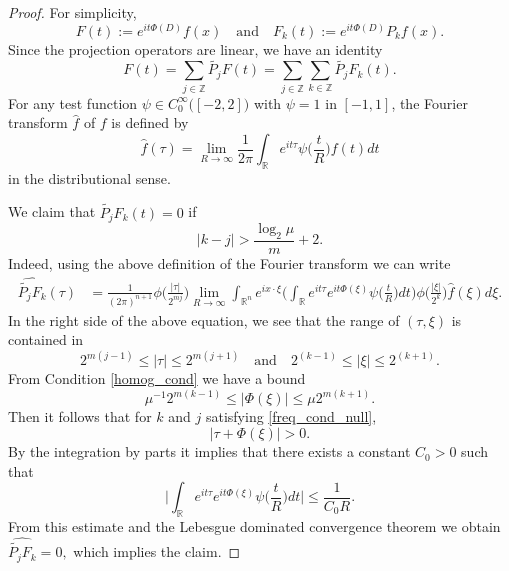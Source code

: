 \documentclass[11pt,reqno]{amsart}
\theoremstyle{plain}
\theoremstyle{definition}
\theoremstyle{remark}
\numberwithin{equation}{section}
\begin{document}
\begin{proof}
For simplicity,
    \[
    F (t) := e^{it\Phi(D)} f(x) \quad\mbox{and}\quad F_k (t) := e^{it\Phi(D)}P_kf(x).
    \]
Since the projection operators are linear, we have an identity
    \[
    F(t) = \sum_{j\in \mathbb{Z}} \widetilde{P_j}F(t) = \sum_{j\in \mathbb{Z}} \sum_{k\in \mathbb{Z}} \widetilde{P_j}F_k(t).
    \]
For any test function $\psi \in C_0^{\infty} \big( [-2, 2] \big)$ with $\psi = 1$ in $[-1,1]$,
the Fourier transform $\widehat{f}$ of $f$ is defined by
    \[
    \widehat{f}(\tau) = \lim_{R\rightarrow\infty} \frac{1}{2\pi} \int_{\mathbb{R}} e^{it\tau} \psi\Big(\frac{t}{R}\Big) f(t) dt
    \]
in the distributional sense.

We claim that $\widetilde{P_j}F_k(t) =0$
if
    \begin{equation}\label{freq_cond_null}
    |k -j| >  \frac{\log_2 \mu}{m}+2.
    \end{equation}
   Indeed, using the above definition of the Fourier transform we can write
    \[
    \begin{aligned}
    \widehat{\widetilde{P_j}F_k}(\tau)
    &= \frac{1}{(2\pi)^{n+1}} {\phi}\Big(\frac{|\tau|}{2^{mj}} \Big)  \lim_{R\rightarrow\infty} \int_{\mathbb{R}^n} e^{ix\cdot\xi} \bigg( \int_{\mathbb{R}} e^{it\tau} e^{it\Phi(\xi)} \psi\Big(\frac{t}{R}\Big) dt \bigg) \phi\Big(\frac{|\xi|}{2^k}\Big) \hat{f}(\xi) d\xi .
    \end{aligned}
    \]
In the right side of the above equation, we see that the range of $(\tau, \xi)$ is contained in 
    \[
    2^{m(j-1)}\leq |\tau|\leq 2^{m(j+1)} \quad\mbox{and}\quad 2^{(k-1)}\leq |\xi| \leq 2^{(k+1)}.
    \]
From Condition \ref{homog_cond}
we have a bound
    \[
    {\mu^{-1}} 2^{m(k-1)}\leq |\Phi(\xi)| \leq \mu 2^{m(k+1)}.
    \]
Then it follows that for  $k$ and $j$ satisfying \eqref{freq_cond_null},
\[
|\tau + \Phi(\xi)| >0.
\] 
By the integration by parts it implies that there exists a constant $C_0>0$ such that
    \[
    \Big| \int_{\mathbb{R}} e^{it\tau} e^{it\Phi(\xi)} \psi\Big(\frac{t}{R}\Big) dt \Big| \le \frac{1}{C_0 R}.
    \]
From this estimate and the Lebesgue dominated convergence theorem we obtain 
$\widehat{\widetilde{P_j}F_k}=0,$
which implies the claim.
%


\end{proof}
\end{document}

